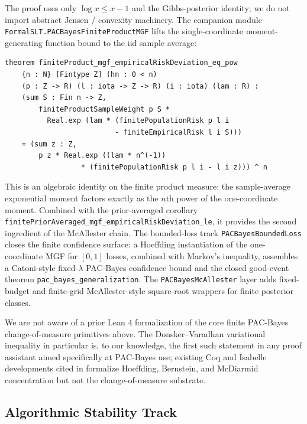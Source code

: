 \documentclass[sigplan,anonymous,review,screen]{acmart}
\begin{document}
The proof uses only $\log x \le x - 1$ and the Gibbs-posterior
identity; we do not import abstract Jensen / convexity machinery. The
companion module \texttt{FormalSLT.PACBayesFiniteProductMGF} lifts the
single-coordinate moment-generating function bound to the iid sample
average:

\begin{lstlisting}[caption={Finite iid product MGF factorization for
                  empirical-risk deviations
                  (\texttt{FormalSLT/PACBayesFiniteProductMGF.lean:94}).},
                  label={lst:product-mgf}]
theorem finiteProduct_mgf_empiricalRiskDeviation_eq_pow
    {n : N} [Fintype Z] (hn : 0 < n)
    (p : Z -> R) (l : iota -> Z -> R) (i : iota) (lam : R) :
    (sum S : Fin n -> Z,
        finiteProductSampleWeight p S *
          Real.exp (lam * (finitePopulationRisk p l i
                          - finiteEmpiricalRisk l i S)))
    = (sum z : Z,
        p z * Real.exp ((lam * n^(-1))
                  * (finitePopulationRisk p l i - l i z))) ^ n
\end{lstlisting}

\noindent
This is an algebraic identity on the finite product measure: the
sample-average exponential moment factors exactly as the $n$th power of
the one-coordinate moment. Combined with the prior-averaged corollary
\texttt{finitePriorAveraged\_mgf\_}\allowbreak\texttt{empiricalRiskDeviation\_le},
it provides the second ingredient of the McAllester chain. The bounded-loss
track \texttt{PACBayesBoundedLoss} closes the finite confidence surface:
a Hoeffding instantiation of the one-coordinate MGF for $[0,1]$ losses,
combined with Markov's inequality, assembles a Catoni-style fixed-$\lambda$
PAC-Bayes confidence bound and the closed good-event theorem
\texttt{pac\_bayes\_generalization}. The \texttt{PACBayesMcAllester} layer
adds fixed-budget and finite-grid McAllester-style square-root wrappers for
finite posterior classes.

We are not aware of a prior Lean 4 formalization of the core finite
PAC-Bayes change-of-measure primitives above. The Donsker--Varadhan variational inequality
in particular is, to our knowledge, the first such statement in any
proof assistant aimed specifically at PAC-Bayes use; existing Coq and
Isabelle developments cited in  formalize Hoeffding,
Bernstein, and McDiarmid concentration but not the change-of-measure
substrate.

\subsection{Algorithmic Stability Track}
\label{sec:stability}
\end{document}
